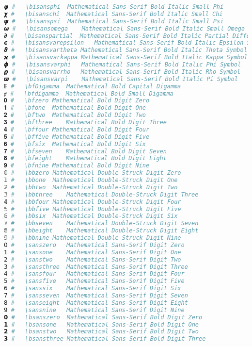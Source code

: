 \begin{lstlisting}[language=Julia]
𝞿 #   \bisansphi  Mathematical Sans-Serif Bold Italic Small Phi
𝟀 #   \bisanschi  Mathematical Sans-Serif Bold Italic Small Chi
𝟁 #   \bisanspsi  Mathematical Sans-Serif Bold Italic Small Psi
𝟂 #   \bisansomega    Mathematical Sans-Serif Bold Italic Small Omega
𝟃 #   \bisanspartial  Mathematical Sans-Serif Bold Italic Partial Differential
𝟄 #   \bisansvarepsilon   Mathematical Sans-Serif Bold Italic Epsilon Symbol
𝟅 #   \bisansvartheta Mathematical Sans-Serif Bold Italic Theta Symbol
𝟆 #   \bisansvarkappa Mathematical Sans-Serif Bold Italic Kappa Symbol
𝟇 #   \bisansvarphi   Mathematical Sans-Serif Bold Italic Phi Symbol
𝟈 #   \bisansvarrho   Mathematical Sans-Serif Bold Italic Rho Symbol
𝟉 #   \bisansvarpi    Mathematical Sans-Serif Bold Italic Pi Symbol
𝟊 #   \bfDigamma  Mathematical Bold Capital Digamma
𝟋 #   \bfdigamma  Mathematical Bold Small Digamma
𝟎 #   \bfzero Mathematical Bold Digit Zero
𝟏 #   \bfone  Mathematical Bold Digit One
𝟐 #   \bftwo  Mathematical Bold Digit Two
𝟑 #   \bfthree    Mathematical Bold Digit Three
𝟒 #   \bffour Mathematical Bold Digit Four
𝟓 #   \bffive Mathematical Bold Digit Five
𝟔 #   \bfsix  Mathematical Bold Digit Six
𝟕 #   \bfseven    Mathematical Bold Digit Seven
𝟖 #   \bfeight    Mathematical Bold Digit Eight
𝟗 #   \bfnine Mathematical Bold Digit Nine
𝟘 #   \bbzero Mathematical Double-Struck Digit Zero
𝟙 #   \bbone  Mathematical Double-Struck Digit One
𝟚 #   \bbtwo  Mathematical Double-Struck Digit Two
𝟛 #   \bbthree    Mathematical Double-Struck Digit Three
𝟜 #   \bbfour Mathematical Double-Struck Digit Four
𝟝 #   \bbfive Mathematical Double-Struck Digit Five
𝟞 #   \bbsix  Mathematical Double-Struck Digit Six
𝟟 #   \bbseven    Mathematical Double-Struck Digit Seven
𝟠 #   \bbeight    Mathematical Double-Struck Digit Eight
𝟡 #   \bbnine Mathematical Double-Struck Digit Nine
𝟢 #   \sanszero   Mathematical Sans-Serif Digit Zero
𝟣 #   \sansone    Mathematical Sans-Serif Digit One
𝟤 #   \sanstwo    Mathematical Sans-Serif Digit Two
𝟥 #   \sansthree  Mathematical Sans-Serif Digit Three
𝟦 #   \sansfour   Mathematical Sans-Serif Digit Four
𝟧 #   \sansfive   Mathematical Sans-Serif Digit Five
𝟨 #   \sanssix    Mathematical Sans-Serif Digit Six
𝟩 #   \sansseven  Mathematical Sans-Serif Digit Seven
𝟪 #   \sanseight  Mathematical Sans-Serif Digit Eight
𝟫 #   \sansnine   Mathematical Sans-Serif Digit Nine
𝟬 #   \bsanszero  Mathematical Sans-Serif Bold Digit Zero
𝟭 #   \bsansone   Mathematical Sans-Serif Bold Digit One
𝟮 #   \bsanstwo   Mathematical Sans-Serif Bold Digit Two
𝟯 #   \bsansthree Mathematical Sans-Serif Bold Digit Three

\end{lstlisting}
